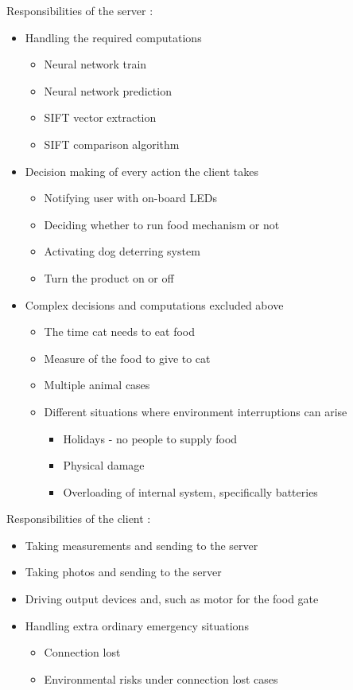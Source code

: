 Responsibilities of the server :
\begin{itemize}
    \item Handling the required computations
    \begin{itemize}
        \item Neural network train
        \item Neural network prediction
        \item SIFT vector extraction
        \item SIFT comparison algorithm
    \end{itemize}
    \item Decision making of every action the client takes
    \begin{itemize}
        \item Notifying user with on-board LEDs
        \item Deciding whether to run food mechanism or not
        \item Activating dog deterring system
        \item Turn the product on or off
    \end{itemize}
    \item Complex decisions and computations excluded above
    \begin{itemize}
        \item The time cat needs to eat food
        \item Measure of the food to give to cat
        \item Multiple animal cases
        \item Different situations where environment interruptions can arise
        \begin{itemize}
            \item Holidays - no people to supply food
            \item Physical damage
            \item Overloading of internal system, specifically batteries
        \end{itemize}
    \end{itemize}
\end{itemize}

Responsibilities of the client :
\begin{itemize}
    \item Taking measurements and sending to the server
    \item Taking photos and sending to the server
    \item Driving output devices and, such as motor for the food gate
    \item Handling extra ordinary emergency situations
    \begin{itemize}
        \item Connection lost
        \item Environmental risks under connection lost cases
    \end{itemize}
\end{itemize}

